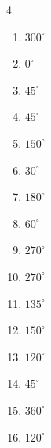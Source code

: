 \begin{multicols}{4}
\begin{enumerate}
  \item $\displaystyle 300^{\circ}$

  \item $\displaystyle 0^{\circ}$
        \phantom{$\displaystyle =0$}

  \item $\displaystyle 45^{\circ}$

  \item $\displaystyle 45^{\circ}$

  \item $\displaystyle 150^{\circ}$

  \item $\displaystyle 30^{\circ}$

  \item $\displaystyle 180^{\circ}$
        \phantom{$\displaystyle =\pi$}

\columnbreak %

  \item $\displaystyle 60^{\circ}$

  \item $\displaystyle 270^{\circ}$

  \item $\displaystyle 270^{\circ}$

  \item $\displaystyle 135^{\circ}$

  \item $\displaystyle 150^{\circ}$

  \item $\displaystyle 120^{\circ}$

  \item $\displaystyle 45^{\circ}$

  \item $\displaystyle 360^{\circ}$
        \phantom{$\displaystyle =2\pi$}

  \item $\displaystyle 120^{\circ}$


\end{enumerate}
\end{multicols}
